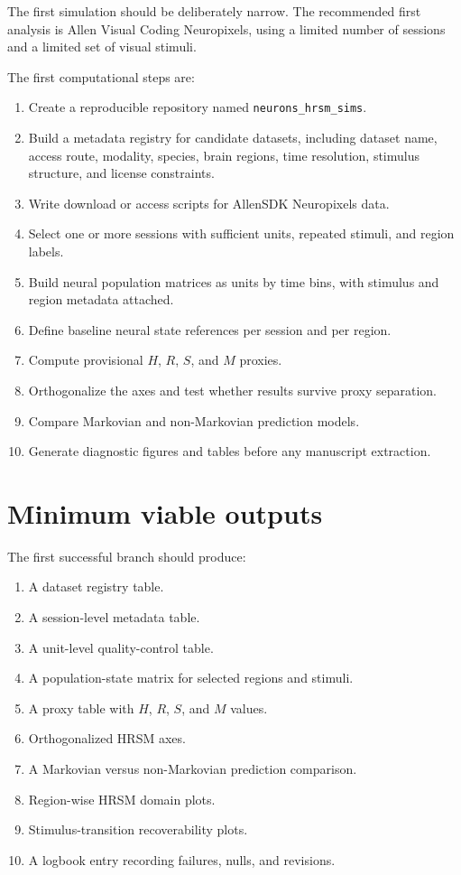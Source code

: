 \documentclass[11pt]{article}
\begin{document}
The first simulation should be deliberately narrow. The recommended first analysis is Allen Visual Coding Neuropixels, using a limited number of sessions and a limited set of visual stimuli.

The first computational steps are:

\begin{enumerate}
    \item Create a reproducible repository named \texttt{neurons\_hrsm\_sims}.
    \item Build a metadata registry for candidate datasets, including dataset name, access route, modality, species, brain regions, time resolution, stimulus structure, and license constraints.
    \item Write download or access scripts for AllenSDK Neuropixels data.
    \item Select one or more sessions with sufficient units, repeated stimuli, and region labels.
    \item Build neural population matrices as units by time bins, with stimulus and region metadata attached.
    \item Define baseline neural state references per session and per region.
    \item Compute provisional $H$, $R$, $S$, and $M$ proxies.
    \item Orthogonalize the axes and test whether results survive proxy separation.
    \item Compare Markovian and non-Markovian prediction models.
    \item Generate diagnostic figures and tables before any manuscript extraction.
\end{enumerate}

\section{Minimum viable outputs}

The first successful branch should produce:

\begin{enumerate}
    \item A dataset registry table.
    \item A session-level metadata table.
    \item A unit-level quality-control table.
    \item A population-state matrix for selected regions and stimuli.
    \item A proxy table with $H$, $R$, $S$, and $M$ values.
    \item Orthogonalized HRSM axes.
    \item A Markovian versus non-Markovian prediction comparison.
    \item Region-wise HRSM domain plots.
    \item Stimulus-transition recoverability plots.
    \item A logbook entry recording failures, nulls, and revisions.
\end{enumerate}
\end{document}
